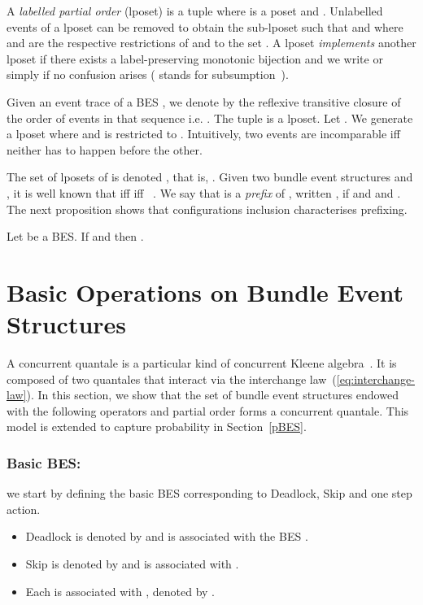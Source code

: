 \documentclass{llncs}
\newcommand{\<}{\langle}
\renewcommand{\>}{\rangle}
\begin{document}
A \emph{labelled partial order} (lposet) is a tuple  where  is a poset and . Unlabelled events of a lposet  can be removed to obtain the sub-lposet  
such that  and where  and  are the respective restrictions of  and  to the set . 
A lposet  \textit{implements} another lposet  if there exists a label-preserving monotonic bijection  and we write  or simply  if no confusion arises ( stands for subsumption~\cite{Gis88}). 


Given an event trace  of a BES , we denote by  the reflexive transitive closure of the order   of events in that sequence i.e. . The tuple  is a lposet. Let . We generate a lposet  where  and  is restricted to . Intuitively, two events are incomparable iff neither has to happen before the other. 


The set of lposets of   is denoted , that is, . Given two bundle event structures  and , it is well known that  iff  iff ~\cite{Kat96,Lan92}. We say that  is a \emph{prefix} of , written , if  and  and . The next proposition shows that configurations inclusion characterises prefixing.

\begin{proposition}\label{pro:configuration-prefix}
Let  be a BES. If  and  then .
\end{proposition}

\section{Basic Operations on Bundle Event Structures}\label{operations}

A concurrent quantale is a particular kind of concurrent Kleene  algebra~\cite{Hoa09}. It is composed of two quantales that interact via the interchange law~(\ref{eq:interchange-law}). In this section, we show that the set   of bundle event structures endowed with the following operators and partial order forms a concurrent quantale.  This model is extended to capture probability in Section~\ref{pBES}. 
\subsubsection*{Basic BES:} we start by defining the basic BES corresponding to Deadlock, Skip and one step action.
\begin{itemize}
\item Deadlock is denoted by  and is associated with the BES .
\item Skip is denoted by  and is associated with .
\item Each  is associated with , denoted by .
\end{itemize}
\end{document}
